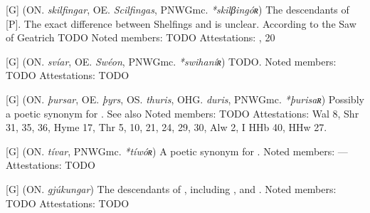 \begin{itemize}
[G] (ON. \emph{skilfingar}, OE. \emph{Scilfingas}, PNWGmc. \emph{*skilβingóʀ})
  The descendants of [P]. The exact difference between Shelfings and  is unclear. According to the Saw of Geatrich TODO
  Noted members: TODO
  Attestations: , 20

[G] (ON. \emph{svíar}, OE. \emph{Swéon}, PNWGmc. \emph{*swihaníʀ})
  TODO.
  Noted members: TODO
  Attestations: TODO

[G] (ON. \emph{þursar}, OE. \emph{þyrs}, OS. \emph{thuris}, OHG. \emph{duris}, PNWGmc. \emph{*þurisaʀ})
  Possibly a poetic synonym for . See also 
  Noted members: TODO
  Attestations: Wal 8, Shr 31, 35, 36, Hyme 17, Thr 5, 10, 21, 24, 29, 30, Alw 2, I HHb 40, HHw 27.

[G] (ON. \emph{tívar}, PNWGmc. \emph{*tíwóʀ})
  A poetic synonym for .
  Noted members: —
  Attestations: TODO

[G] (ON. \emph{gjúkungar})
  The descendants of , including ,  and .
  Noted members: TODO
  Attestations: TODO

\end{itemize}
